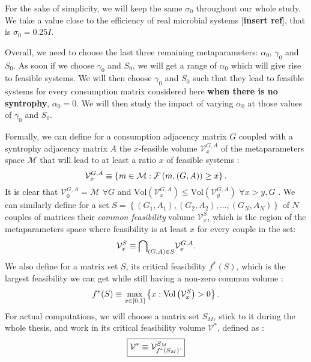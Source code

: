 \documentclass[12pt, titlepage]{report}
\begin{document}
For the sake of simplicity, we will keep the same $\sigma_0$ throughout our whole study. We take a value close to the efficiency of real microbial systems [\textbf{insert ref}], that is $\sigma_0 =0.25I$.

Overall, we need to choose the last three remaining metaparameters: $\alpha_0$, $\gamma_0$ and $S_0$. As soon if we choose $\gamma_0$ and $S_0$, we will get a range of $\alpha_0$ which will give rise to feasible systems.
We will then choose $\gamma_0$ and $S_0$ such that they lead to feasible systems for every consumption matrix considered here \textbf{when there is no syntrophy}, \ie $\alpha_0=0$. We will then study the impact of varying $\alpha_0$ at those values of $\gamma_0$ and $S_0$.

Formally, we can define for a consumption adjacency matrix $G$ coupled with a syntrophy adjacency matrix $A$ the $x$-feasible volume $\mathcal{V}^{G,A}_x$ of the metaparameters space $\mathcal{M}$ that will lead to at least a ratio $x$ of feasible systems \ie :
\begin{equation}
\mathcal{V}^{G,A}_x \equiv \left\{m \in \mathcal{M} : \mathcal{F}\left(m, (G,A)\right)\geq x \right\}. \label{eq : x feasible volume}
\end{equation}
It is clear that $\mathcal{V}^{G,A}_0 = \mathcal{M}$ $\forall G$ and $\text{Vol}\left(\mathcal{V}^{G,A}_{x}\right) \leq \text{Vol}\left(\mathcal{V}^{G,A}_{y}\right)$ $\forall x > y, G$ . We can similarly define for a set $S = \left\{ (G_1,A_1) , (G_2, A_2), \dots, (G_N, A_N)\right\}$ of $N$ couples of matrices their \textit{common feasibility} volume $\mathcal{V}^S_x$, which is the region of the metaparameters space where feasibility is at least $x$ for every couple in the set:
\begin{equation}
\mathcal{V}^S_x \equiv {\bigcap}_{(G,A) \in S} \mathcal{V}^{G,A}_x.
\end{equation}
We also define for a matrix set $S$, its critical feasibility $f^*(S)$, which is the largest feasibility we can get while still having a non-zero common volume :
\begin{equation}
f^*(S) \equiv \max_{x \in \left[0,1\right]}\left\{ x : \text{Vol}\left(\mathcal{V}^S_x\right) > 0 \right\}.
\end{equation}
For actual computations, we will choose a matrix set $S_M$, stick to it during the whole thesis, and work in its critical feasibility volume $\mathcal{V}^*$, defined as :
\begin{equation}\boxed{
\mathcal{V}^* \equiv \mathcal{V}^{S_M}_{f^*(S_M)}.
}
\end{equation}
\end{document}
